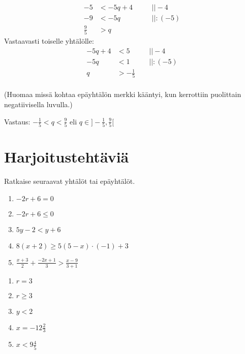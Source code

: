 \begin{align*}
-5&<-5q+4 \ \ \ \ \ &&|| -4 \\
-9&<-5q &&|| :(-5) \\
\frac95&>q
\end{align*}
Vastaavasti toiselle yhtälölle:
\begin{align*}
-5q+4&<5  \ \ \ \ \ &&|| -4 \\
-5q&<1 &&|| :(-5) \\
q&>-\frac15 \\
\end{align*}

(Huomaa missä kohtaa epäyhtälön merkki kääntyi, kun kerrottiin puolittain negatiivisella luvulla.)

Vastaus: $-\frac15<q<\frac95$ eli $q\in ]-\frac15,\frac95[$

\section{Harjoitustehtäviä}
\begin{tehtava}
    Ratkaise seuraavat yhtälöt tai epäyhtälöt.
    \begin{enumerate}
        \item $-2r+6=0$
        \item $-2r+6\leq 0$
        \item $5y-2<y+6$
        \item $8(x+2)\geq 5(5-x)\cdot (-1)+3$
        \item $\frac{x+3}{2}+\frac{-2x+1}{3}>\frac{x-9}{3+1}$
    \end{enumerate}
    \begin{vastaus}
        \begin{enumerate}
            \item $r=3$
            \item $r\geq 3$
            \item $y<2$
            \item $x=-12\frac{2}{3}$
            \item $x<9\frac{4}{5}$
        \end{enumerate}
    \end{vastaus}
\end{tehtava}

